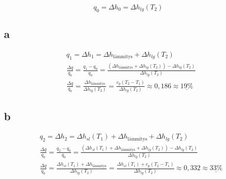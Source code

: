 \documentclass[12pt,a4paper,finnish]{article}
\begin{document}
\begin{equation}
 q_0 = \Delta h_0 = \Delta h_{lg}(T_2)
\end{equation}

\subsection{a}

\begin{align}
 &q_1 = \Delta h_1 = \Delta h_{\text{lämmitys}} + \Delta h_{lg}(T_2)\\
 &\frac{\Delta q}{q_0} = \frac{q_1 - q_0}{q_0} = \frac{(\Delta h_{\text{lämmitys}} + \Delta h_{lg}(T_2)) - \Delta h_{lg}(T_2)}{\Delta h_{lg}(T_2)}\\
 &\frac{\Delta q}{q_0} = \frac{\Delta h_{\text{lämmitys}}}{\Delta h_{lg}(T_2)} = \frac{c_p(T_2 - T_1)}{\Delta h_{lg}(T_2)}\approx 0,186 \approx \underline{19\%}
\end{align}

\subsection{b}

\begin{align}
 &q_2 = \Delta h_2 = \Delta h_{sl}(T_1) + \Delta h_{\text{lämmitys}} + \Delta h_{lg}(T_2)\\
 &\frac{\Delta q}{q_0} = \frac{q_2 - q_0}{q_0} = \frac{(\Delta h_{sl}(T_1) + \Delta h_{\text{lämmitys}} + \Delta h_{lg}(T_2)) - \Delta h_{lg}(T_2)}{\Delta h_{lg}(T_2)}\\
 &\frac{\Delta q}{q_0} = \frac{\Delta h_{sl}(T_1) + \Delta h_{\text{lämmitys}}}{\Delta h_{lg}(T_2)} 
 = \frac{\Delta h_{sl}(T_1)+ c_p(T_2 - T_1)}{\Delta h_{lg}(T_2)}\approx 0,332 \approx \underline{33\%}
 \end{align}
\end{document}
